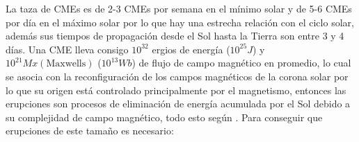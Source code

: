 La taza de \acp{CME} es de 2-3 \acp{CME} por semana en el mínimo solar y de 5-6 \acp{CME} por día en el máximo solar por lo que hay una estrecha relación con el ciclo solar, además sus tiempos de propagación desde el Sol hasta la Tierra son entre 3 y 4 días. Una \ac{CME} lleva consigo $10^{32}$ ergios de energía ($10^{25}J$) y $10^{21}Mx (\text{Maxwells})$ ($10^{13}Wb$) de flujo de campo magnético en promedio, lo cual se asocia con la reconfiguración de los campos magnéticos de la corona solar por lo que su origen está controlado principalmente por el magnetismo, entonces las erupciones son procesos de eliminación de energía acumulada por el Sol debido a su complejidad de campo magnético, todo esto según \cite[e.g.,][]{lugaz-2017}. 
Para conseguir que erupciones de este tamaño es necesario:
